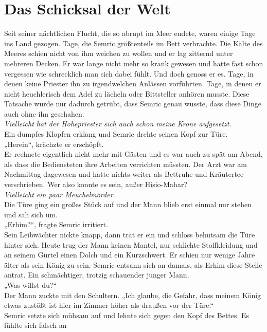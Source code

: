 \chapter{Das Schicksal der Welt}

Seit seiner nächtlichen Flucht, die so abrupt im Meer endete, waren einige Tage ins Land 
gezogen. Tage, die Semric größtenteils im Bett verbrachte. Die Kälte des Meeres schien nicht von ihm 
weichen zu wollen und er lag zitternd unter mehreren Decken. Er war lange nicht mehr so krank 
gewesen und hatte fast schon vergessen wie schrecklich man sich dabei fühlt. Und doch genoss er es. 
Tage, in denen keine Priester ihn zu irgendwelchen Anlässen vorführten. Tage, in denen er nicht 
heuchlerisch dem Adel zu lächeln oder Bittsteller anhören musste. Diese Tatsache wurde nur dadurch 
getrübt, dass Semric genau wusste, dass diese Dinge auch ohne ihn geschahen.\\
\textit{Vielleicht hat der Hohepriester sich auch schon meine Krone aufgesetzt.}\\
Ein dumpfes Klopfen erklang und Semric drehte seinen Kopf zur Türe.\\
„Herein“, krächzte er erschöpft.\\
Er rechnete eigentlich nicht mehr mit Gästen und es war auch zu spät am Abend, als dass die 
Bediensteten ihre Arbeiten verrichten müssten. Der Arzt war am Nachmittag dagewesen und hatte nichts 
weiter als Bettruhe und Kräutertee verschrieben. Wer also konnte es sein, außer Hisio-Mahar?\\
\textit{Vielleicht ein paar Meuchelmörder.}\\
Die Türe ging ein großes Stück auf und der Mann blieb erst einmal nur stehen und sah sich um. \\
„Erhim?“, fragte Semric irritiert.\\
Sein Leibwächter nickte knapp, dann trat er ein und schloss behutsam die Türe hinter sich. Heute 
trug der Mann keinen Mantel, nur schlichte Stoffkleidung und an seinem Gürtel einen Dolch und ein 
Kurzschwert. Er schien nur wenige Jahre älter als sein König zu sein. Semric entsann sich an damals, 
als Erhim diese Stelle antrat. Ein schmächtiger, trotzig schauender junger Mann. \\
„Was willst du?“\\
Der Mann zuckte mit den Schultern. „Ich glaube, die Gefahr, dass meinem König etwas zustößt ist hier 
im Zimmer höher als draußen vor der Türe.“\\
Semric setzte sich mühsam auf und lehnte sich gegen den Kopf des Bettes. Es fühlte sich falsch an 

